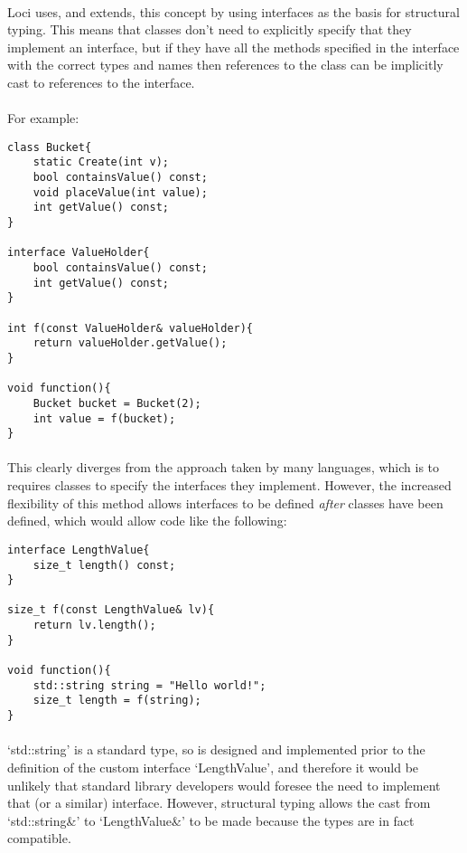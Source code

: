 \documentclass[12pt,twoside,notitlepage]{report}
\begin{document}
\paragraph{}
Loci uses, and extends, this concept by using interfaces as the basis for structural typing. This means that classes don't need to explicitly specify that they implement an interface, but if they have all the methods specified in the interface with the correct types and names then references to the class can be implicitly cast to references to the interface.

\paragraph{}
For example:


\begin{lstlisting}
class Bucket{
	static Create(int v);
	bool containsValue() const;
	void placeValue(int value);
	int getValue() const;
}

interface ValueHolder{
	bool containsValue() const;
	int getValue() const;
}

int f(const ValueHolder& valueHolder){
	return valueHolder.getValue();
}

void function(){
	Bucket bucket = Bucket(2);
	int value = f(bucket);
}
\end{lstlisting}


\paragraph{}
This clearly diverges from the approach taken by many languages, which is to requires classes to specify the interfaces they implement. However, the increased flexibility of this method allows interfaces to be defined \emph{after} classes have been defined, which would allow code like the following:


\begin{lstlisting}
interface LengthValue{
	size_t length() const;
}

size_t f(const LengthValue& lv){
	return lv.length();
}

void function(){
	std::string string = "Hello world!";
	size_t length = f(string);
}
\end{lstlisting}


\paragraph{}
`std::string' is a standard type, so is designed and implemented prior to the definition of the custom interface `LengthValue', and therefore it would be unlikely that standard library developers would foresee the need to implement that (or a similar) interface. However, structural typing allows the cast from `std::string\&' to `LengthValue\&' to be made because the types are in fact compatible.
\end{document}
